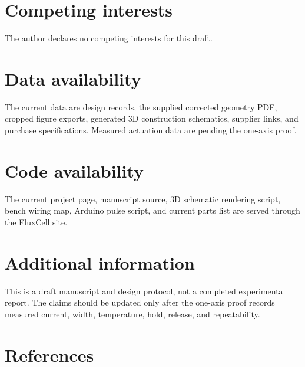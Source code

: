 \documentclass[12pt,letterpaper]{article}
\begin{document}
\section{Competing interests}

The author declares no competing interests for this draft.

\section{Data availability}

The current data are design records, the supplied corrected geometry PDF, cropped figure exports, generated 3D construction schematics, supplier links, and purchase specifications. Measured actuation data are pending the one-axis proof.

\section{Code availability}

The current project page, manuscript source, 3D schematic rendering script, bench wiring map, Arduino pulse script, and current parts list are served through the FluxCell site.

\section{Additional information}

This is a draft manuscript and design protocol, not a completed experimental report. The claims should be updated only after the one-axis proof records measured current, width, temperature, hold, release, and repeatability.

\section{References}

\printbibliography[heading=none]
\end{document}
